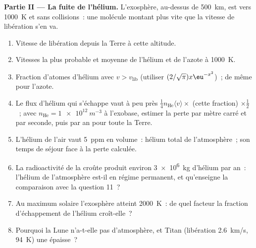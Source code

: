 \begin{problem}
\textbf{Partie II --- La fuite de l'hélium.}
L'exosphère, au-dessus de \qty{500}{km}, est vers \qty{1000}{K} et
sans collisions~: une molécule montant plus vite que la vitesse de libération
s'en va.
\begin{enumerate}[resume]
  \item Vitesse de libération depuis la Terre à cette altitude.
  \item Vitesses la plus probable et moyenne de l'hélium et de l'azote à
        \qty{1000}{K}.
  \item Fraction d'atomes d'hélium avec $v > v_{\text{lib}}$ (utiliser
        $(2/\sqrt\pi)x\eu^{-x^2}$)~; de même pour l'azote.
  \item Le flux d'hélium qui s'échappe vaut à peu près $\tfrac14n_{\text{He}}\langle
        v\rangle \times$ (cette fraction) $\times\tfrac12$~; avec $n_{\text{He}}
        = \qty{1e12}{m^{-3}}$ à l'exobase, estimer la perte par mètre
        carré et par seconde, puis par an pour toute la Terre.
  \item L'hélium de l'air vaut \qty{5}{ppm} en volume~: hélium total de
        l'atmosphère~; son temps de séjour face à la perte calculée.
  \item La radioactivité de la croûte produit environ \qty{3e6}{kg} d'hélium
        par an~: l'hélium de l'atmosphère est-il en régime permanent, et
        qu'enseigne la comparaison avec la question 11~?
  \item Au maximum solaire l'exosphère atteint \qty{2000}{K}~: de quel
        facteur la fraction d'échappement de l'hélium croît-elle~?
  \item Pourquoi la Lune n'a-t-elle pas d'atmosphère, et Titan (libération
        \qty{2.6}{km/s}, \qty{94}{K}) une épaisse~?
\end{enumerate}


\end{problem}
